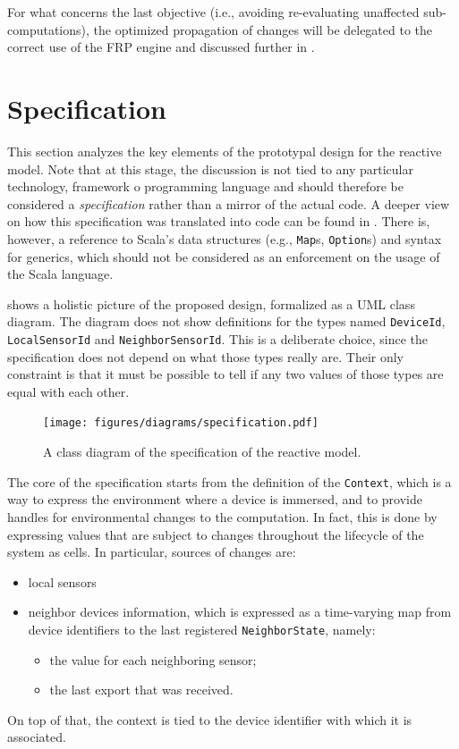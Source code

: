 For what concerns the last objective (i.e., avoiding re-evaluating unaffected sub-computations), the optimized propagation of changes will be delegated to the correct use of the FRP engine and discussed further in .

\section{Specification}
\label{sec:specification}

This section analyzes the key elements of the prototypal design for the reactive model.
%
Note that at this stage, the discussion is not tied to any particular technology, framework o programming language and should therefore be considered a \textit{specification} rather than a mirror of the actual code.
%
A deeper view on how this specification was translated into code can be found in .
% 
There is, however, a reference to Scala's data structures (e.g., \texttt{Map}s, \texttt{Option}s) and syntax for generics, which should not be considered as an enforcement on the usage of the Scala language.

 shows a holistic picture of the proposed design, formalized as a UML class diagram.
%
The diagram does not show definitions for the types named \texttt{DeviceId}, \texttt{LocalSensorId} and \texttt{NeighborSensorId}.
%
This is a deliberate choice, since the specification does not depend on what those types really are.
%
Their only constraint is that it must be possible to tell if any two values of those types are equal with each other.
%
\begin{figure}
    \centering
    \texttt{[image: figures/diagrams/specification.pdf]}
    \caption{A class diagram of the specification of the reactive model.}
    \label{fig:class-diagram}
\end{figure}

The core of the specification starts from the definition of the \texttt{Context}, which is a way to express the environment where a device is immersed, and to provide handles for environmental changes to the computation.
%
In fact, this is done by expressing values that are subject to changes throughout the lifecycle of the system as cells.
%
In particular, sources of changes are:
%
\begin{itemize}
    \item local sensors
    \item neighbor devices information, which is expressed as a time-varying map from device identifiers to the last registered \texttt{NeighborState}, namely:
    \begin{itemize}
        \item the value for each neighboring sensor;
        \item the last export that was received.
    \end{itemize}
\end{itemize}
%
On top of that, the context is tied to the device identifier with which it is associated.

